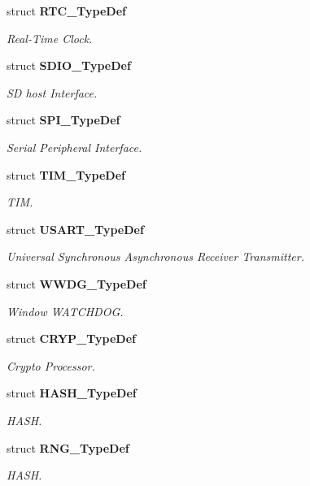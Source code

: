 \begin{DoxyCompactItemize}
struct \textbf{ R\+T\+C\+\_\+\+Type\+Def}
\begin{DoxyCompactList}\small\item\em Real-\/\+Time Clock. \end{DoxyCompactList}\item 
struct \textbf{ S\+D\+I\+O\+\_\+\+Type\+Def}
\begin{DoxyCompactList}\small\item\em SD host Interface. \end{DoxyCompactList}\item 
struct \textbf{ S\+P\+I\+\_\+\+Type\+Def}
\begin{DoxyCompactList}\small\item\em Serial Peripheral Interface. \end{DoxyCompactList}\item 
struct \textbf{ T\+I\+M\+\_\+\+Type\+Def}
\begin{DoxyCompactList}\small\item\em T\+IM. \end{DoxyCompactList}\item 
struct \textbf{ U\+S\+A\+R\+T\+\_\+\+Type\+Def}
\begin{DoxyCompactList}\small\item\em Universal Synchronous Asynchronous Receiver Transmitter. \end{DoxyCompactList}\item 
struct \textbf{ W\+W\+D\+G\+\_\+\+Type\+Def}
\begin{DoxyCompactList}\small\item\em Window W\+A\+T\+C\+H\+D\+OG. \end{DoxyCompactList}\item 
struct \textbf{ C\+R\+Y\+P\+\_\+\+Type\+Def}
\begin{DoxyCompactList}\small\item\em Crypto Processor. \end{DoxyCompactList}\item 
struct \textbf{ H\+A\+S\+H\+\_\+\+Type\+Def}
\begin{DoxyCompactList}\small\item\em H\+A\+SH. \end{DoxyCompactList}\item 
struct \textbf{ R\+N\+G\+\_\+\+Type\+Def}
\begin{DoxyCompactList}\small\item\em H\+A\+SH. \end{DoxyCompactList}\item 

\end{DoxyCompactItemize}
